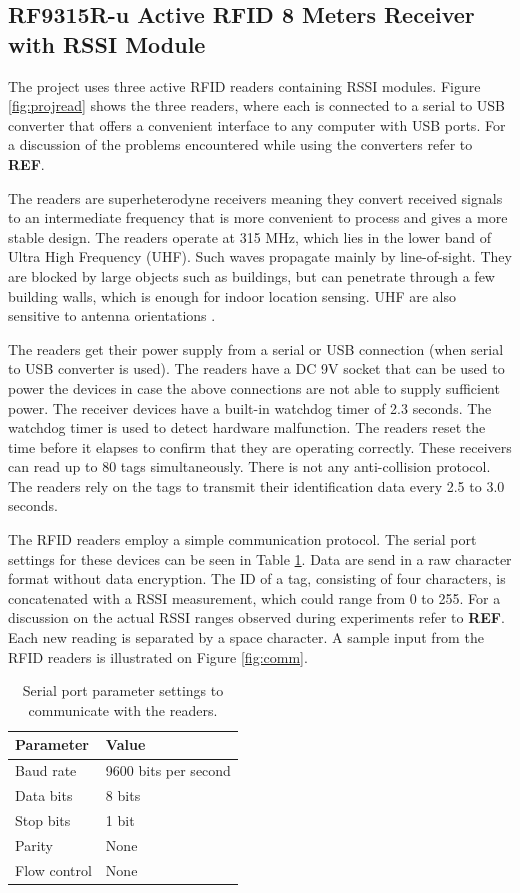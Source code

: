 \subsection{RF9315R-u Active RFID 8 Meters Receiver with RSSI Module}
\label{subsec:receiver}

The project uses three active RFID readers containing RSSI modules. Figure \ref{fig:projread} shows the three readers, where each is connected to a serial to USB converter that offers a convenient interface to any computer with USB ports. For a discussion of the problems encountered while using the converters refer to \textbf{REF}. 

The readers are superheterodyne receivers meaning they convert received signals to an intermediate frequency that is more convenient to process and gives a more stable design. The readers operate at 315 MHz, which lies in the lower band of Ultra High Frequency (UHF). Such waves propagate mainly by line-of-sight. They are blocked by large objects such as buildings, but can penetrate through a few building walls, which is enough for indoor location sensing. UHF are also sensitive to antenna orientations \cite[p. 15]{Hunt2007}.

The readers get their power supply from a serial or USB connection (when serial to USB converter is used). The readers have a DC 9V socket that can be used to power the devices in case the above connections are not able to supply sufficient power. The receiver devices have a built-in watchdog timer of 2.3 seconds. The watchdog timer is used to detect hardware malfunction. The readers reset the time before it elapses to confirm that they are operating correctly. These receivers can read up to 80 tags simultaneously. There is not any anti-collision protocol. The readers rely on the tags to transmit their identification data every 2.5 to 3.0 seconds.

The RFID readers employ a simple communication protocol. The serial port settings for these devices can be seen in Table \ref{tbl:comm}. Data are send in a raw character format without data encryption. The ID of a tag, consisting of four characters, is concatenated with a RSSI measurement, which could range from 0 to 255. For a discussion on the actual RSSI ranges observed during experiments refer to \textbf{REF}. Each new reading is separated by a space character. A sample input from the RFID readers is illustrated on Figure \ref{fig:comm}. 

\begin{table}[h]
	\centering
	\begin{tabular}{ | m{4cm} || m{4cm} | }
		\hline
		\textbf{Parameter}		& \textbf{Value} \\ \hline
		Baud rate				& 9600 bits per second \\ \hline
		Data bits				& 8 bits \\ \hline
		Stop bits				& 1 bit \\ \hline
		Parity					& None \\ \hline
		Flow control			& None \\ \hline
	\end{tabular}
	\caption{Serial port parameter settings to communicate with the readers.}
	\label{tbl:comm}
\end{table}

